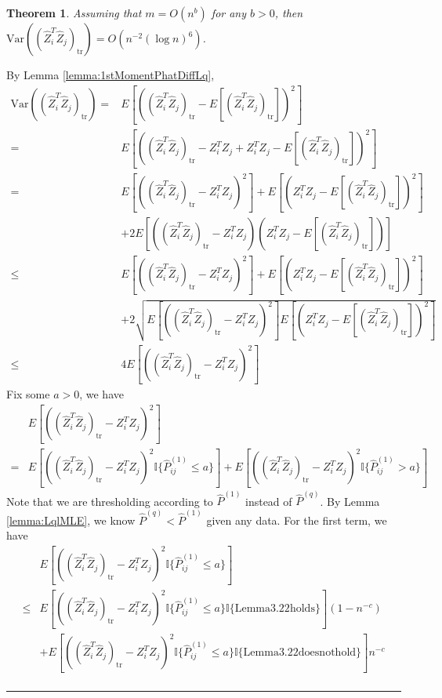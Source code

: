 \documentclass[a4paper]{article}
\newenvironment{proof}{{\bf Proof:  }}{\hfill\rule{2mm}{2mm}}
\newtheorem{theorem}[fact]{Theorem}
\begin{document}
\begin{theorem}
\label{thm:VarASELq}
Assuming that $m = O(n^b)$ for any $b > 0$, then $\mathrm{Var}((\hat{Z}_i^T \hat{Z}_j)_{\mathrm{tr}}) = O(n^{-2} (\log n)^6)$.
\end{theorem}
\begin{proof}
By Lemma \ref{lemma:1stMomentPhatDiffLq},
\begin{align*}
	\mathrm{Var}((\hat{Z}_i^T \hat{Z}_j)_{\mathrm{tr}})
    = & E[((\hat{Z}_i^T \hat{Z}_j)_{\mathrm{tr}} - E[(\hat{Z}_i^T \hat{Z}_j)_{\mathrm{tr}}])^2] \\
    = & E[((\hat{Z}_i^T \hat{Z}_j)_{\mathrm{tr}} - Z_i^T Z_j + Z_i^T Z_j - E[(\hat{Z}_i^T \hat{Z}_j)_{\mathrm{tr}}])^2] \\
    = & E[((\hat{Z}_i^T \hat{Z}_j)_{\mathrm{tr}} - Z_i^T Z_j)^2] + E[(Z_i^T Z_j - E[(\hat{Z}_i^T \hat{Z}_j)_{\mathrm{tr}}])^2] \\ 
    & + 2E[((\hat{Z}_i^T \hat{Z}_j)_{\mathrm{tr}} - Z_i^T Z_j)(Z_i^T Z_j - E[(\hat{Z}_i^T \hat{Z}_j)_{\mathrm{tr}}])] \\
    \le & E[((\hat{Z}_i^T \hat{Z}_j)_{\mathrm{tr}} - Z_i^T Z_j)^2] + E[(Z_i^T Z_j - E[(\hat{Z}_i^T \hat{Z}_j)_{\mathrm{tr}}])^2] \\ 
    & + 2\sqrt{E[((\hat{Z}_i^T \hat{Z}_j)_{\mathrm{tr}} - Z_i^T Z_j)^2] E[(Z_i^T Z_j - E[(\hat{Z}_i^T \hat{Z}_j)_{\mathrm{tr}}])^2]} \\
    \le & 4 E[((\hat{Z}_i^T \hat{Z}_j)_{\mathrm{tr}} - Z_i^T Z_j)^2]
\end{align*}
Fix some $a > 0$, we have
\begin{align*}
	& E[((\hat{Z}_i^T \hat{Z}_j)_{\mathrm{tr}} - Z_i^T Z_j)^2] \\
	= & E[((\hat{Z}_i^T \hat{Z}_j)_{\mathrm{tr}} - Z_i^T Z_j)^2 \mathbb{I}\{\hat{P}^{(1)}_{ij} \le a\}]
	+ E[((\hat{Z}_i^T \hat{Z}_j)_{\mathrm{tr}} - Z_i^T Z_j)^2 \mathbb{I}\{\hat{P}^{(1)}_{ij} > a\}]
\end{align*}
Note that we are thresholding according to $\hat{P}^{(1)}$ instead of $\hat{P}^{(q)}$. By Lemma \ref{lemma:LqlMLE}, we know $\hat{P}^{(q)} < \hat{P}^{(1)}$ given any data.
For the first term, we have
\begin{align*}
	& E[((\hat{Z}_i^T \hat{Z}_j)_{\mathrm{tr}} - Z_i^T Z_j)^2 \mathbb{I}\{\hat{P}^{(1)}_{ij} \le a\}] \\
	\le & E[((\hat{Z}_i^T \hat{Z}_j)_{\mathrm{tr}} - Z_i^T Z_j)^2 \mathbb{I}\{\hat{P}^{(1)}_{ij} \le a\} \mathbb{I}\{\mathrm{Lemma 3.22 holds}\}] (1 - n^{-c}) \\
	& + E[((\hat{Z}_i^T \hat{Z}_j)_{\mathrm{tr}} - Z_i^T Z_j)^2 \mathbb{I}\{\hat{P}^{(1)}_{ij} \le a\} \mathbb{I}\{\mathrm{Lemma 3.22 does not hold}\}] n^{-c} \\

\end{align*}
\end{proof}
\end{document}
